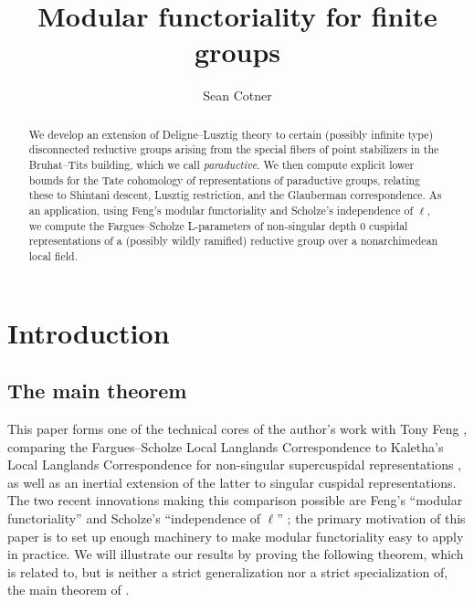 \documentclass[reqno]{amsart}
\title[Modular functoriality for finite groups]{Modular functoriality for finite groups}
\author{Sean Cotner}
\numberwithin{equation}{subsection}
\theoremstyle{remark}
\numberwithin{equation}{subsection}
\numberwithin{figure}{subsection}
\begin{document}
\begin{abstract}
We develop an extension of Deligne--Lusztig theory to certain (possibly infinite type) disconnected reductive groups arising from the special fibers of point stabilizers in the Bruhat--Tits building, which we call \emph{paraductive}. We then compute explicit lower bounds for the Tate cohomology of representations of paraductive groups, relating these to Shintani descent, Lusztig restriction, and the Glauberman correspondence. As an application, using Feng's modular functoriality and Scholze's independence of $\ell$, we compute the Fargues--Scholze L-parameters of non-singular depth $0$ cuspidal representations of a (possibly wildly ramified) reductive group over a nonarchimedean local field.
\end{abstract}

\maketitle

\tableofcontents



\section{Introduction}

\subsection{The main theorem}

This paper forms one of the technical cores of the author's work with Tony Feng \cite{CF26a}, \cite{CF26b} comparing the Fargues--Scholze Local Langlands Correspondence \cite{FS} to Kaletha's Local Langlands Correspondence for non-singular supercuspidal representations \cite{Kal21b}, as well as an inertial extension of the latter to singular cuspidal representations. The two recent innovations making this comparison possible are Feng's ``modular functoriality'' \cite[Theorem~1.3.1]{F24} and Scholze's ``independence of $\ell$'' \cite[Theorem~1.1]{Sch25}; the primary motivation of this paper is to set up enough machinery to make modular functoriality easy to apply in practice. We will illustrate our results by proving the following theorem, which is related to, but is neither a strict generalization nor a strict specialization of, the main theorem of \cite{CF26b}.
\end{document}
